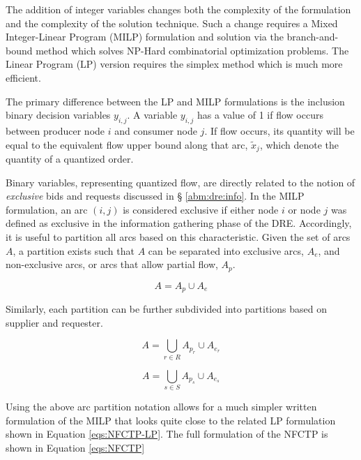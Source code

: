 The addition of integer variables changes both the complexity of the formulation
and the complexity of the solution technique. Such a change requires a Mixed
Integer-Linear Program (MILP) formulation and solution via the branch-and-bound
method which solves NP-Hard combinatorial optimization problems. The Linear
Program (LP) version requires the simplex method which is much more efficient.

The primary difference between the LP and MILP formulations is the inclusion
binary decision variables $y_{i,j}$. A variable $y_{i,j}$ has a value of 1 if
flow occurs between producer node $i$ and consumer node $j$. If flow occurs, its
quantity will be equal to the equivalent flow upper bound along that arc,
$\tilde{x}_{j}$, which denote the quantity of a quantized order.

Binary variables, representing quantized flow, are directly related to the
notion of \textit{exclusive} bids and requests discussed in \S
\ref{abm:dre:info}. In the MILP formulation, an arc $(i, j)$ is considered
exclusive if either node $i$ or node $j$ was defined as exclusive in the
information gathering phase of the DRE. Accordingly, it is useful to partition
all arcs based on this characteristic. Given the set of arcs $A$, a partition
exists such that $A$ can be separated into exclusive arcs, $A_e$, and
non-exclusive arcs, or arcs that allow partial flow, $A_p$.

\begin{equation}\label{eqs:arc-union}
  A = A_{p} \cup A_{e}
\end{equation}

Similarly, each partition can be further subdivided into partitions based on
supplier and requester. 

\begin{equation}\label{eqs:arc-union}
  A = \bigcup_{r \in R} A_{p_r} \cup A_{e_r}
\end{equation}

\begin{equation}\label{eqs:arc-union}
  A = \bigcup_{s \in S} A_{p_s} \cup A_{e_s}
\end{equation}

Using the above arc partition notation allows for a much simpler written
formulation of the MILP that looks quite close to the related LP formulation
shown in Equation \ref{eqs:NFCTP-LP}. The full formulation of the NFCTP is shown
in Equation \ref{eqs:NFCTP}

